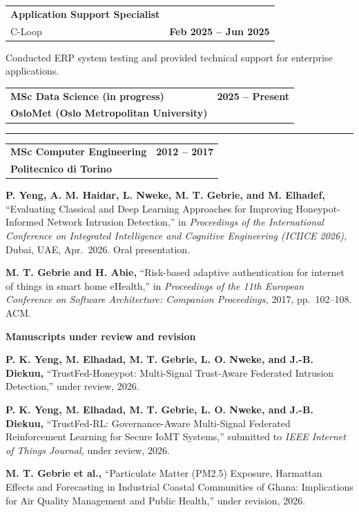 \documentclass[a4paper,10pt]{article}
\makeatletter
\newcommand{\cvsection}[1]{%
  \vspace{1.5\parskip}%
  {\color{accent}\bfseries\fontsize{7}{8}\selectfont\textls[140]{\MakeUppercase{#1}}\par}%
  \vspace{0.65em}%
}
\newcommand{\jobhead}[3]{%
  \noindent
  \begin{tabular*}{\textwidth}{@{}p{0.72\textwidth}@{\extracolsep{\fill}}r@{}}
    {\bfseries\fontsize{10.5}{12}\selectfont #1}\\[0.1em]
    {\color{accent}\fontsize{9.5}{11}\selectfont #2} &
    {\color{muted}\fontsize{8.5}{10}\selectfont\bfseries #3}
  \end{tabular*}\par
  \vspace{0.35em}%
}
\newcommand{\edurow}[3]{%
  \begin{tabularx}{\textwidth}{@{}X r@{}}
    \textbf{\fontsize{10}{12}\selectfont #1} &
    {\color{muted}\fontsize{8.5}{10}\selectfont\bfseries #3} \\
    {\color{accent}\fontsize{9}{11}\selectfont\bfseries #2} & \\
  \end{tabularx}%
}
\newcommand{\eduseparator}{%
  \par\vspace{0.55em}%
  {\color{rule}\rule{\textwidth}{0.55pt}\par}%
  \vspace{0.55em}%
}
\makeatother
\begin{document}
\jobhead{Application Support Specialist}{C-Loop}{Feb 2025 -- Jun 2025}
{\fontsize{9.5}{13.5}\selectfont Conducted ERP system testing and provided technical support for enterprise applications.\par}

\vspace{1.5em}

\cvsection{Education}

\noindent
\edurow{MSc Data Science (in progress)}{OsloMet (Oslo Metropolitan University)}{2025 -- Present}
\eduseparator
\noindent
\edurow{MSc Computer Engineering}{Politecnico di Torino}{2012 -- 2017}

\vspace{1.5em}

\cvsection{Publications}
{\justifying\fontsize{9.5}{13.8}\selectfont
\textbf{P. Yeng, A. M. Haidar, L. Nweke, M. T. Gebrie, and M. Elhadef,} ``Evaluating Classical and Deep Learning Approaches for Improving Honeypot-Informed Network Intrusion Detection,'' in \textit{Proceedings of the International Conference on Integrated Intelligence and Cognitive Engineering (ICIICE 2026),} Dubai, UAE, Apr.\ 2026. Oral presentation.\par}
\vspace{0.65em}
{\justifying\fontsize{9.5}{13.8}\selectfont
\textbf{M. T. Gebrie and H. Abie,} ``Risk-based adaptive authentication for internet of things in smart home eHealth,'' in \textit{Proceedings of the 11th European Conference on Software Architecture: Companion Proceedings,} 2017, pp.\ 102--108. ACM.\par}

\vspace{0.85em}
{\color{muted}\fontsize{8}{9.5}\selectfont\bfseries Manuscripts under review and revision\par}
\vspace{0.4em}
{\justifying\fontsize{9.5}{13.8}\selectfont
\textbf{P. K. Yeng, M. Elhadad, M. T. Gebrie, L. O. Nweke, and J.-B. Diekuu,} ``TrustFed-Honeypot: Multi-Signal Trust-Aware Federated Intrusion Detection,'' under review, 2026.\par}
\vspace{0.4em}
{\justifying\fontsize{9.5}{13.8}\selectfont
\textbf{P. K. Yeng, M. Elhadad, M. T. Gebrie, L. O. Nweke, and J.-B. Diekuu,} ``TrustFed-RL: Governance-Aware Multi-Signal Federated Reinforcement Learning for Secure IoMT Systems,'' submitted to \textit{IEEE Internet of Things Journal,} under review, 2026.\par}
\vspace{0.4em}
{\justifying\fontsize{9.5}{13.8}\selectfont
\textbf{M. T. Gebrie et al.,} ``Particulate Matter (PM2.5) Exposure, Harmattan Effects and Forecasting in Industrial Coastal Communities of Ghana: Implications for Air Quality Management and Public Health,'' under revision, 2026.\par}
\end{document}
